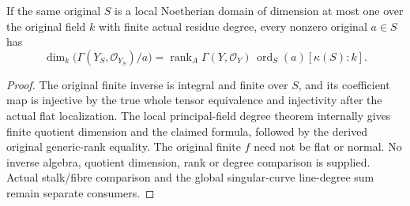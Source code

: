 \begin{theorem}
\label{thm:fc-localized-finite-principal-field-degree}
\leanok
{}
If the same original $S$ is a local Noetherian domain of dimension at most
one over the original field $k$ with finite actual residue degree, every
nonzero original $a\in S$ has
\[
 \dim_k\bigl(\Gamma(Y_S,\mathcal O_{Y_S})/a\bigr)
 =\operatorname{rank}_A\Gamma(Y,\mathcal O_Y)\,
   \operatorname{ord}_S(a)[\kappa(S):k].
\]
\end{theorem}
\begin{proof}
The original finite inverse is integral and finite over $S$, and its
coefficient map is injective by the true whole tensor equivalence and
injectivity after the actual flat localization.  The local principal-field
degree theorem internally gives finite quotient dimension and the claimed
formula, followed by the derived original generic-rank equality.  The
original finite $f$ need not be flat or normal.  No inverse algebra,
quotient dimension, rank or degree comparison is supplied.  Actual
stalk/fibre comparison and the global singular-curve line-degree sum remain
separate consumers.
\end{proof}
